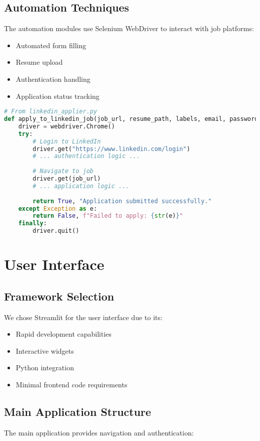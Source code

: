 \documentclass[12pt,a4paper]{report}
\begin{document}
\subsection{Automation Techniques}
The automation modules use Selenium WebDriver to interact with job platforms:
\begin{itemize}
    \item Automated form filling
    \item Resume upload
    \item Authentication handling
    \item Application status tracking
\end{itemize}

\begin{lstlisting}[language=Python, caption=LinkedIn Application Automation (Excerpt)]
# From linkedin_applier.py
def apply_to_linkedin_job(job_url, resume_path, labels, email, password):
    driver = webdriver.Chrome()
    try:
        # Login to LinkedIn
        driver.get("https://www.linkedin.com/login")
        # ... authentication logic ...
        
        # Navigate to job
        driver.get(job_url)
        # ... application logic ...
        
        return True, "Application submitted successfully."
    except Exception as e:
        return False, f"Failed to apply: {str(e)}"
    finally:
        driver.quit()
\end{lstlisting}

\section{User Interface}

\subsection{Framework Selection}
We chose Streamlit for the user interface due to its:
\begin{itemize}
    \item Rapid development capabilities
    \item Interactive widgets
    \item Python integration
    \item Minimal frontend code requirements
\end{itemize}

\subsection{Main Application Structure}
The main application provides navigation and authentication:
\end{document}
